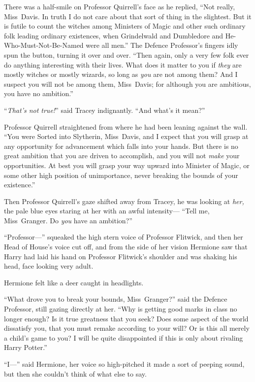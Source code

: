 There was a half-smile on Professor Quirrell’s face as he replied, “Not really, Miss~Davis. In truth I do not care about that sort of thing in the slightest. But it is futile to count the witches among Ministers of Magic and other such ordinary folk leading ordinary existences, when Grindelwald and Dumbledore and He-Who-Must-Not-Be-Named were all men.” The Defence Professor’s fingers idly spun the button, turning it over and over. “Then again, only a very few folk ever do anything interesting with their lives. What does it matter to you if \emph{they} are mostly witches or mostly wizards, so long as \emph{you} are not among them? And I suspect you will not be among them, Miss~Davis; for although you are ambitious, you have no ambition.”

“\emph{That’s not true!}” said Tracey indignantly. “And what’s it mean?”

Professor Quirrell straightened from where he had been leaning against the wall. “You were Sorted into Slytherin, Miss~Davis, and I expect that you will grasp at any opportunity for advancement which falls into your hands. But there is no great ambition that you are driven to accomplish, and you will not \emph{make} your opportunities. At best you will grasp your way upward into Minister of Magic, or some other high position of unimportance, never breaking the bounds of your existence.”

Then Professor Quirrell’s gaze shifted away from Tracey, he was looking at \emph{her,} the pale blue eyes staring at her with an awful intensity— “Tell me, Miss~Granger. Do \emph{you} have an ambition?”

“Professor—” squeaked the high stern voice of Professor Flitwick, and then her Head of House’s voice cut off, and from the side of her vision Hermione saw that Harry had laid his hand on Professor Flitwick’s shoulder and was shaking his head, face looking very adult.

Hermione felt like a deer caught in headlights.

“What drove you to break your bounds, Miss~Granger?” said the Defence Professor, still gazing directly at her. “Why is getting good marks in class no longer enough? Is it true greatness that you seek? Does some aspect of the world dissatisfy you, that you must remake according to your will? Or is this all merely a child’s game to you? I will be quite disappointed if this is only about rivaling Harry Potter.”

“I—” said Hermione, her voice so high-pitched it made a sort of peeping sound, but then she couldn’t think of what else to say.

